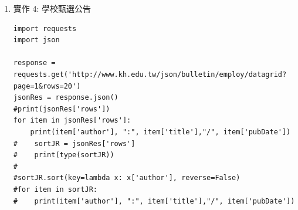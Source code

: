 \documentclass[a4paper,12pt]{article}
\begin{document}
\begin{enumerate}
\begin{verbatim}
'108學年度明誠高中第3號第3次公告第1次修正', 'pubDate': '109-05-04'}, {'author': '鼓山高中', 'attributes': {'subjects': '', 'url': 'https://employ.kh.edu.tw/Html/2020/5/鼓山區108學年度鼓山高中第11號第3次公告簡章.html', 'target': '_blank'}, 'title': '108學年度鼓山高中第11號第3次公告', 'pubDate': '109-05-04'}, {'author': '南成國小', 'attributes': {'subjects': '兼任特教代課教師', 'url': 'https://employ.kh.edu.tw/Html/2020/5/鳳山區108學年度南成國小第3號第3次公告簡章.html', 'target': '_blank'}, 'title': '108學年度南成國小第3號第3次公告', 'pubDate': '109-05-01'}, {'author': '青山國小', 'attributes': {'subjects': '', 'url': 'https://employ.kh.edu.tw/Html/2020/4/小港區108學年度青山國小第8號第1次公告簡章.html', 'target': '_blank'}, 'title': '108學年度青山國小第8號第1次公告', 'pubDate': '109-04-30'}, {'author': '明宗國小', 'attributes': {'subjects': '', 'url': 'https://employ.kh.edu.tw/Html/2020/4/湖內區108學年度明宗國小第5號第1次公告簡章.html', 'target': '_blank'}, 'title': '108學年度明宗國小第5號第1次公告', 'pubDate': '109-04-30'}, {'author': '大社國中', 'attributes': {'subjects': '國文', 'url': 'https://employ.kh.edu.tw/Html/2020/4/大社區108學年度大社國中第5號第3次公告簡章.html', 'target': '_blank'}, 'title': '108學年度大社國中第5號第3次公告', 'pubDate': '109-04-29'}, {'author': '小港國小', 'attributes': {'subjects': '健康與體適能科', 'url': 'https://employ.kh.edu.tw/Html/2020/4/小港區108學年度小港國小第15號第3次公告簡章.html', 'target': '_blank'}, 'title': '108學年度小港國小第15號第3次公告', 'pubDate': '109-04-21'}, {'author': '小港國小', 'attributes': {'subjects': '一般智能資賦優異資源班', 'url': 'https://employ.kh.edu.tw/Html/2020/4/小港區108學年度小港國小第13號第2次公告簡章.html', 'target': '_blank'}, 'title': '108學年度小港國小第13號第2次公告', 'pubDate': '109-04-18'}, {'author': '鼓山國小', 'attributes': {'subjects': '普通科', 'url': 'https://employ.kh.edu.tw/Html/2020/4/旗山區108學年度鼓山國小第6號第3次公告簡章.html', 'target': '_blank'}, 'title': '108學年度鼓山國小第6號第3次公告', 'pubDate': '109-04-16'}, {'author': '新民國小', 'attributes': {'subjects': '普通科代理(須代導師)', 'url': 'https://employ.kh.edu.tw/Html/2020/4/左營區108學年度新民國小第9號第3次公告簡章.html', 'target': '_blank'}, 'title': '108學年度新民國小第9號第3次公告', 'pubDate': '109-04-14'}]}
\end{verbatim}

\item 實作 4: 學校甄選公告
\label{sec:org3a76ba0}
\lstset{breaklines=true,language=Python,label= ,caption= ,captionpos=b,firstnumber=1,numbers=left}
\begin{lstlisting}
import requests
import json

response = requests.get('http://www.kh.edu.tw/json/bulletin/employ/datagrid?page=1&rows=20')
jsonRes = response.json()
#print(jsonRes['rows'])
for item in jsonRes['rows']:
    print(item['author'], ":", item['title'],"/", item['pubDate'])
#    sortJR = jsonRes['rows']
#    print(type(sortJR))
#
#sortJR.sort(key=lambda x: x['author'], reverse=False)
#for item in sortJR:
#    print(item['author'], ":", item['title'],"/", item['pubDate'])
\end{lstlisting}
\end{enumerate}
\end{document}
